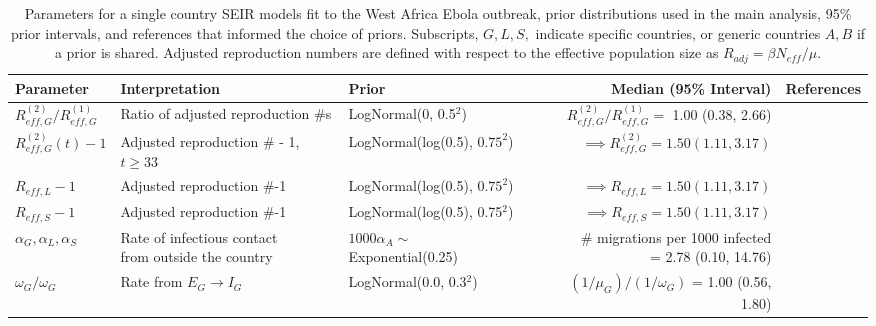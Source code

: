 \begin{table}
	\begin{fullpage}
		\caption[Parameters and priors for single country SEIR models fit to the West Africa Ebola outbreak.]{Parameters for a single country SEIR models fit to the West Africa Ebola outbreak, prior distributions used in the main analysis, 95\% prior intervals, and references that informed the choice of priors. Subscripts, $ G,L,S, $ indicate specific countries, or generic countries $ A,B $ if a prior is shared. Adjusted reproduction numbers are defined with respect to the effective population size as $ R_{adj} = \beta N_{eff} /\mu $.}
		\label{tab:ebola_priors_single_tight}
		\scriptsize
		\centering
		\begin{tabular}{lllrr}
			\hline
			\textbf{Parameter} &  \textbf{Interpretation} & \textbf{Prior} & \textbf{Median (95\% Interval)} & \textbf{References} \\ \hline
			$ R_{eff,G}^{(2)} / R_{eff,G}^{(1)} $ & Ratio of adjusted reproduction \#s &  LogNormal(0, 0.5$ ^2 $) & $ R_{eff,G}^{(2)} / R_{eff,G}^{(1)} = $ 1.00 (0.38, 2.66) & \cite{chowell2014transmission,chretien2015mathematical,coltart2017ebola,king2015avoidable} \\
			$ R_{eff,G}^{(2)}(t)-1 $ & Adjusted reproduction \# - 1, $ t\geq33 $ & LogNormal(log(0.5), $ 0.75^2 $) & $ \implies R_{eff,G}^{(2)} = 1.50 (1.11, 3.17)$ &  \cite{chowell2014transmission,chretien2015mathematical,coltart2017ebola,king2015avoidable} \\
			$ R_{eff,L} -1 $ & Adjusted reproduction \#-1 &  LogNormal(log(0.5), $ 0.75^2 $) & $ \implies R_{eff,L} = 1.50 (1.11, 3.17)$ &  \cite{chowell2014transmission,chretien2015mathematical,coltart2017ebola,king2015avoidable} \\
			$ R_{eff,S}-1 $ & Adjusted reproduction \#-1 & LogNormal(log(0.5), 0.75$ ^2 $) & $ \implies R_{eff,S} = 1.50 (1.11, 3.17)$ &  \cite{chowell2014transmission,chretien2015mathematical,coltart2017ebola,king2015avoidable}\\
			$ \alpha_{G},\alpha_{L}, \alpha_{S}$ & \makecell[l]{Rate of infectious contact \\ from outside the country} & $ 1000\alpha_{A} \sim$ Exponential(0.25) & \makecell[r]{\# migrations per 1000 infected \\ = 2.78 (0.10, 14.76)} & \cite{dudas2017virus}\\ 
			$ \omega_G/\omega_G $ & Rate from $ E_G\rightarrow I_G $ & LogNormal(0.0, 0.3$ ^2 $) & $ (1/\mu_G)\big/(1/\omega_G) $ = 1.00 (0.56, 1.80) & \cite{chowell2014transmission,velasquez2015time,glynn2017variability} \\

\end{tabular}
\end{fullpage}
\end{table}
